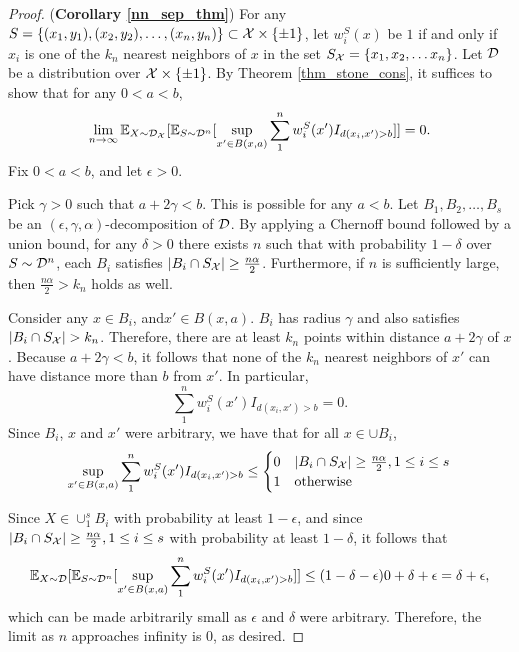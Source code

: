\begin{proof} (\textbf{Corollary \ref{nn_sep_thm}})
For any $S = \{(x_1, y_1), (x_2, y_2), \dots, (x_n, y_n)\} \subset \mathcal X \times \{\pm 1\}$, let $w_i^S(x)$ be $1$ if and only if $x_i$ is one of the $k_n$ nearest neighbors of $x$ in the set $S_\mathcal X = \{x_1, x_2, \dots x_n\}$. Let ${\mathcal D}$ be a distribution over $\mathcal X \times \{\pm 1\}$. By Theorem \ref{thm_stone_cons}, it suffices to show that for any $0 < a < b$, $$\lim_{n \to \infty} \mathbb{E}_{X \sim {\mathcal D}_\mathcal X}[\mathbb{E}_{S \sim {\mathcal D}^n} [\sup_{x' \in B(x,a)} \sum_1^n w_i^S(x')I_{d(x_i, x') > b}]] = 0.$$ Fix $0 < a < b$, and let $\epsilon > 0$. 

Pick $\gamma > 0$ such that $a+ 2\gamma < b$. This is possible for any $a < b$. Let $B_1, B_2, \dots, B_s$ be an $(\epsilon, \gamma, \alpha)$-decomposition of ${\mathcal D}$. By applying a Chernoff bound followed by a union bound, for any $\delta > 0$ there exists $n$ such that with probability $1-\delta$ over $S \sim {\mathcal D}^n$, each $B_i$ satisfies $|B_i \cap S_\mathcal X| \geq \frac{n\alpha}{2}$. Furthermore, if $n$ is sufficiently large, then $\frac{n\alpha}{2} > k_n$ holds as well. 

Consider any $x \in B_i$, and$x' \in B(x,a)$. $B_i$ has radius $\gamma$ and also satisfies $|B_i \cap S_\mathcal X| > k_n$. Therefore, there are at least $k_n$ points within distance $a+2\gamma$ of $x$. Because $a + 2\gamma < b$, it follows that none of the $k_n$ nearest neighbors of $x'$ can have distance more than $b$ from $x'$. In particular, $$\sum_1^n w_i^S(x')I_{d(x_i, x') > b} = 0.$$ Since $B_i$, $x$ and $x'$ were arbitrary, we have that for all $x \in \cup B_i$, $$\sup_{x' \in B(x,a)} \sum_1^n w_i^S(x')I_{d(x_i, x') > b} \leq  \begin{cases} 0 & |B_i \cap S_\mathcal X| \geq \frac{n\alpha}{2}, 1 \leq i \leq s \\ 1 & \text{otherwise} \end{cases}$$

Since $X \in \cup_1^s B_i$ with probability at least $1-\epsilon$, and since $|B_i \cap S_\mathcal X| \geq \frac{n\alpha}{2}, 1 \leq i \leq s$ with probability at least $1-\delta$, it follows that $$\mathbb{E}_{X \sim {\mathcal D}}[\mathbb{E}_{S \sim {\mathcal D}^n} [\sup_{x' \in B(x,a)} \sum_1^n w_i^S(x')I_{d(x_i, x') > b}]] \leq (1- \delta - \epsilon)0 + \delta + \epsilon = \delta + \epsilon,$$ which can be made arbitrarily small as $\epsilon$ and $\delta$ were arbitrary. Therefore, the limit as $n$ approaches infinity is $0$, as desired.
\end{proof}


